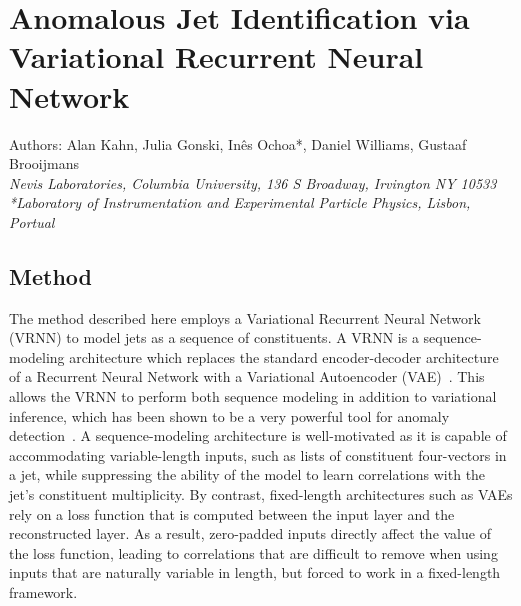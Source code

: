 \documentclass[letterpaper,11pt]{article}
\begin{document}
\section*{Anomalous Jet Identification via Variational Recurrent Neural Network}
Authors: Alan Kahn, Julia Gonski, In\^{e}s Ochoa*, Daniel Williams, Gustaaf Brooijmans \\ \textit{Nevis Laboratories, Columbia University, 136 S Broadway, Irvington NY 10533}\\
\textit{*Laboratory of Instrumentation and Experimental Particle Physics, Lisbon, Portual}\\



\subsection{Method}
\label{sec:method}


The method described here employs a Variational Recurrent Neural Network (VRNN) to model jets as a sequence of constituents. A VRNN is a sequence-modeling architecture which replaces the standard encoder-decoder architecture of a Recurrent Neural Network with a Variational Autoencoder (VAE)~\cite{chung2016recurrent}. 
This allows the VRNN to perform both sequence modeling in addition to variational inference, which has been shown to be a very powerful tool for anomaly detection~\cite{An2015VariationalAB}.
A sequence-modeling architecture is well-motivated as it is capable of accommodating variable-length inputs, such as lists of constituent four-vectors in a jet, while suppressing the ability of the model to learn correlations with the jet's constituent multiplicity.
By contrast, fixed-length architectures such as VAEs rely on a loss function that is computed between the input layer and the reconstructed layer. As a result, zero-padded inputs directly affect the value of the loss function, leading to correlations that are difficult to remove when using inputs that are naturally variable in length, but forced to work in a fixed-length framework. 
\end{document}
